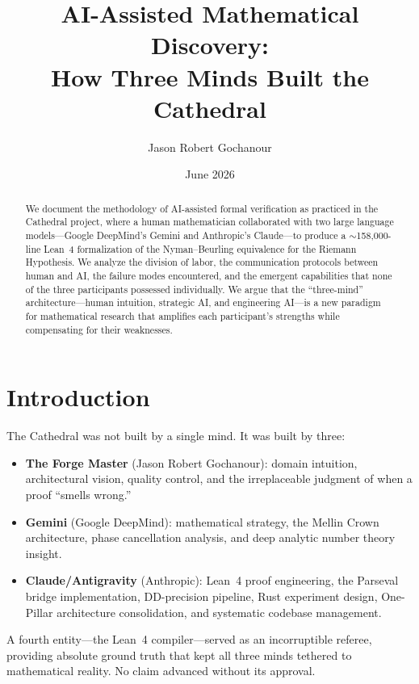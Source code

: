 \documentclass[11pt,a4paper]{article}
\title{%
  AI-Assisted Mathematical Discovery:\\
  How Three Minds Built the Cathedral%
}
\author{Jason Robert Gochanour}
\date{June 2026}
\begin{document}
\maketitle

\begin{abstract}
We document the methodology of AI-assisted formal verification as
practiced in the Cathedral project, where a human mathematician
collaborated with two large language models---Google DeepMind's
Gemini and Anthropic's Claude---to produce a $\sim$158{,}000-line Lean~4
formalization of the Nyman--Beurling equivalence for the Riemann
Hypothesis. We analyze the division of labor, the communication
protocols between human and AI, the failure modes encountered,
and the emergent capabilities that none of the three participants
possessed individually. We argue that the ``three-mind''
architecture---human intuition, strategic AI, and engineering AI---is
a new paradigm for mathematical research that amplifies each
participant's strengths while compensating for their weaknesses.
\end{abstract}

\tableofcontents

\section{Introduction}

The Cathedral was not built by a single mind. It was built by three:
\begin{itemize}
  \item \textbf{The Forge Master} (Jason Robert Gochanour): domain
    intuition, architectural vision, quality control, and the
    irreplaceable judgment of when a proof ``smells wrong.''
  \item \textbf{Gemini} (Google DeepMind): mathematical strategy,
    the Mellin Crown architecture, phase cancellation analysis,
    and deep analytic number theory insight.
  \item \textbf{Claude/Antigravity} (Anthropic): Lean~4 proof
    engineering, the Parseval bridge implementation, DD-precision
    pipeline, Rust experiment design, One-Pillar architecture
    consolidation, and systematic codebase management.
\end{itemize}

A fourth entity---the Lean~4 compiler---served as an incorruptible
referee, providing absolute ground truth that kept all three minds
tethered to mathematical reality. No claim advanced without its
approval.
\end{document}
